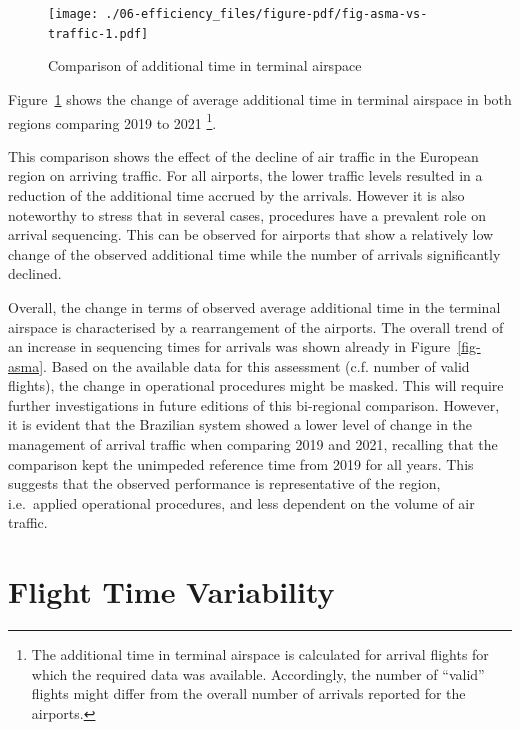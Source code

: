 \documentclass[
  a4paper,
  DIV=11,
  numbers=noendperiod]{scrreprt}
\begin{document}
\begin{figure}[h]

{\centering \texttt{[image: ./06-efficiency\_files/figure-pdf/fig-asma-vs-traffic-1.pdf]}

}

\caption{\label{fig-asma-vs-traffic}Comparison of additional time in
terminal airspace}

\end{figure}

Figure~\ref{fig-asma-vs-traffic} shows the change of average additional
time in terminal airspace in both regions comparing 2019 to 2021
\footnote{The additional time in terminal airspace is calculated for
  arrival flights for which the required data was available.
  Accordingly, the number of ``valid'' flights might differ from the
  overall number of arrivals reported for the airports.}.

This comparison shows the effect of the decline of air traffic in the
European region on arriving traffic. For all airports, the lower traffic
levels resulted in a reduction of the additional time accrued by the
arrivals. However it is also noteworthy to stress that in several cases,
procedures have a prevalent role on arrival sequencing. This can be
observed for airports that show a relatively low change of the observed
additional time while the number of arrivals significantly declined.

Overall, the change in terms of observed average additional time in the
terminal airspace is characterised by a rearrangement of the airports.
The overall trend of an increase in sequencing times for arrivals was
shown already in Figure~\ref{fig-asma}. Based on the available data for
this assessment (c.f. number of valid flights), the change in
operational procedures might be masked. This will require further
investigations in future editions of this bi-regional comparison.
However, it is evident that the Brazilian system showed a lower level of
change in the management of arrival traffic when comparing 2019 and
2021, recalling that the comparison kept the unimpeded reference time
from 2019 for all years. This suggests that the observed performance is
representative of the region, i.e.~applied operational procedures, and
less dependent on the volume of air traffic.

\hypertarget{flight-time-variability}{%
\section{Flight Time Variability}\label{flight-time-variability}}
\end{document}
